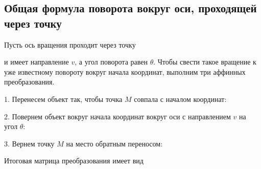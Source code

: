\documentclass[a4paper,14pt]{extarticle}
\begin{document}
\subsection*{Общая формула поворота вокруг оси, проходящей через точку}

Пусть ось вращения проходит через точку

\begin{center}\end{center}

и имеет направление $v$, а угол поворота равен $\theta$. Чтобы свести такое вращение к уже известному повороту вокруг начала координат, выполним три аффинных преобразования.

1. Перенесем объект так, чтобы точка $M$ совпала с началом координат:

\begin{center}\end{center}

2. Повернем объект вокруг начала координат вокруг оси с направлением $v$ на угол $\theta$:

\begin{center}\end{center}

3. Вернем точку $M$ на место обратным переносом:

\begin{center}\end{center}

Итоговая матрица преобразования имеет вид
\end{document}
